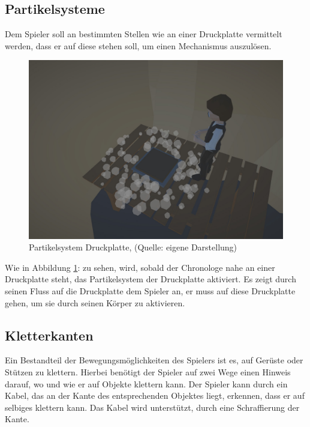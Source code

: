 \subsection{Partikelsysteme}\label{sec:particle-system}
Dem Spieler soll an bestimmten Stellen wie an einer Druckplatte vermittelt werden, dass er auf diese stehen soll, um einen Mechanismus auszulösen.

\begin{figure}[ht]
\centering
\includegraphics[width=0.8\linewidth]{content/pictures/Pressureplate_tooltip.jpg}
\caption{Partikelsystem Druckplatte, (Quelle: eigene Darstellung)}
\label{fig:pressureplate_tooltip}
\end{figure}

Wie in Abbildung \ref{fig:pressureplate_tooltip}:  zu sehen, wird, sobald der Chronologe nahe an einer Druckplatte steht, das Partikelsystem der Druckplatte aktiviert. Es zeigt durch seinen Fluss auf die Druckplatte dem Spieler an, er muss auf diese Druckplatte gehen, um sie durch seinen Körper zu aktivieren.

\subsection{Kletterkanten}\label{sec:leadge}
Ein Bestandteil der Bewegungsmöglichkeiten des Spielers ist es, auf Gerüste oder Stützen zu klettern. Hierbei benötigt der Spieler auf zwei Wege einen Hinweis darauf, wo und wie er auf Objekte klettern kann.
Der Spieler kann durch ein Kabel, das an der Kante des entsprechenden Objektes liegt, erkennen, dass er auf selbiges klettern kann. Das Kabel wird unterstützt, durch eine Schraffierung der Kante.


